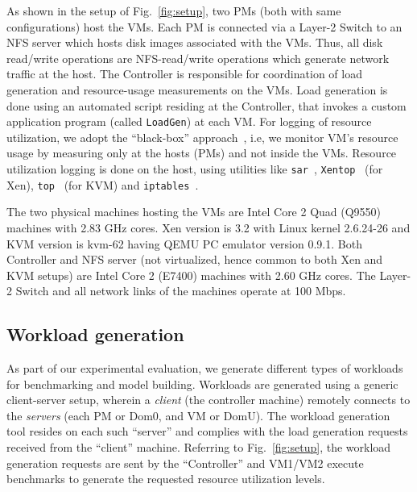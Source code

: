 As shown in the setup of Fig.~\ref{fig:setup}, two PMs (both with same 
configurations) host the VMs. Each PM
is connected via a Layer-2 Switch to an NFS server which hosts
disk images associated with the VMs. Thus, all disk read/write
operations are NFS-read/write operations which generate network traffic
at the host. The Controller is responsible
for coordination of load generation and resource-usage measurements 
on the VMs.
Load generation is done using an automated script residing at the Controller,
that invokes a custom application program (called \texttt{LoadGen})
at each VM.
For logging of resource utilization, we adopt the ``black-box''
approach~\cite{sandpiper}, i.e, we monitor VM's resource usage by measuring 
only at the hosts (PMs) and not inside the VMs.
Resource utilization logging is done on the host, using utilities like
\texttt{sar}~\cite{sar}, \texttt{Xentop}~\cite{xentop} (for Xen), 
\texttt{top}~\cite{top} (for KVM) and 
\texttt{iptables}~\cite{iptables}.

The two physical machines hosting the VMs are Intel Core 2
Quad (Q9550) machines with 2.83 GHz cores. Xen version is
3.2 with Linux kernel 2.6.24-26 and KVM version is kvm-62
having QEMU PC emulator version 0.9.1.
Both Controller and NFS server (not virtualized, hence common to 
both Xen and KVM setups) are Intel Core 2 (E7400) machines with 
2.60 GHz cores.
The Layer-2 Switch and all network links of the
machines operate at 100 Mbps.


\subsection{Workload generation}
\label{sec:arescue-workloadgen}
As part of our experimental evaluation, we generate 
different types of workloads for benchmarking and
model building.
Workloads are generated using a generic client-server setup,
wherein a \textit{client}
(the controller machine) remotely connects to 
the \textit{servers} (each PM or Dom0,
and VM or DomU). %
The workload generation
tool resides on each such ``server'' and complies with the 
load generation
requests received from the ``client'' machine. 
Referring to Fig.~\ref{fig:setup}, the 
workload generation requests are sent by the ``Controller''
and VM1/VM2 execute benchmarks to generate the 
requested resource utilization levels. 

